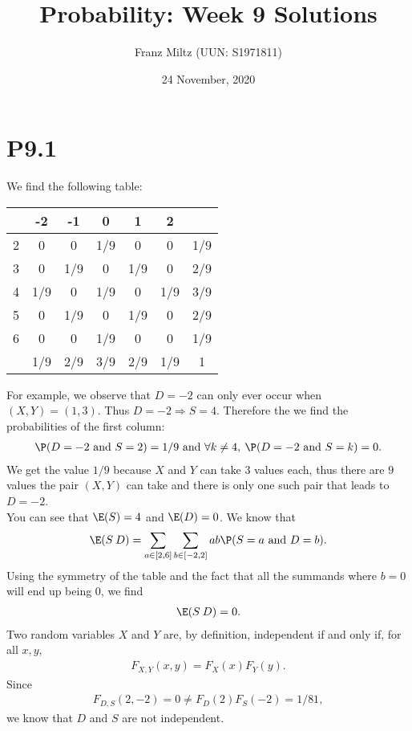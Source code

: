 \documentclass{article}
\begin{document}
\title{Probability: Week 9 Solutions}
\author{Franz Miltz (UUN: S1971811)}
\date{24 November, 2020}
\maketitle

\section*{P9.1}

We find the following table:
\begin{center}
	\begin{tabular}{| c | c c c c c | c |}
		\hline
		\backslashbox{S}{D} & -2  & -1  & 0   & 1   & 2   &     \\
		\hline
		2                   & 0   & 0   & 1/9 & 0   & 0   & 1/9 \\
		3                   & 0   & 1/9 & 0   & 1/9 & 0   & 2/9 \\
		4                   & 1/9 & 0   & 1/9 & 0   & 1/9 & 3/9 \\
		5                   & 0   & 1/9 & 0   & 1/9 & 0   & 2/9 \\
		6                   & 0   & 0   & 1/9 & 0   & 0   & 1/9 \\
		\hline
		                    & 1/9 & 2/9 & 3/9 & 2/9 & 1/9 & 1   \\
		\hline
	\end{tabular}
\end{center}
For example, we observe that $D=-2$ can only ever occur when $(X,Y)=(1,3)$.
Thus $D=-2\Rightarrow S=4$. Therefore the we find the probabilities of the first column:
\begin{align*}
	\P(D=-2 \text{ and } S=2) = 1/9 \text{ and }\forall k \not=4,\: \P(D=-2 \text{ and } S = k) = 0 .
\end{align*}
We get the value $1/9$ because $X$ and $Y$ can take $3$ values each,
thus there are $9$ values the pair $(X,Y)$
can take and there is only one such pair that leads to $D=-2$.\\
You can see that $\E(S)=4$ and $\E(D)=0$. We know that
\begin{align*}
	\E(S\:D) = \sum_{a\in [2,6]} \sum_{b\in[-2,2]} ab\P(S=a\text{ and }D=b).
\end{align*}
Using the symmetry of the table and the fact that all the summands
where $b=0$ will end up being $0$, we find
\begin{align*}
	\E(S\:D)=0.
\end{align*}
Two random variables $X$ and $Y$ are, by definition, independent
if and only if, for all $x,y$,
\begin{align*}
	F_{X,Y}(x,y)=F_X(x)F_Y(y).
\end{align*}
Since
\begin{align*}
	F_{D,S}(2,-2) = 0 \not= F_D(2)F_S(-2) = 1/81,
\end{align*}
we know that $D$ and $S$ are not independent.
\end{document}
